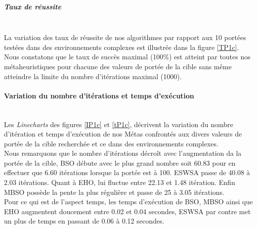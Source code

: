 \noindent
\begin{minipage}[t]{0.5\textwidth}
	\subparagraph{Taux de réussite}
	\textbf{}\\
	
	La variation des taux de réussite de nos algorithmes par rapport aux 10 portées testées dans des environnements complexes est illustrée dans la figure \ref{TP1c}.\\
	
	Nous constatons que le taux de succès maximal (100\%) est atteint par toutes nos métaheuristiques pour chacune des valeurs de portée de la cible sans même atteindre la limite du nombre d'itérations maximal (1000).

\end{minipage}\hfill
\begin{minipage}[t]{0.55\textwidth}
	\captionsetup{width=0.8\linewidth}
	\centering{}
	\vspace{-0.2cm}
	\label{TP1c}
\end{minipage}\hfill







\noindent
	\paragraph{Variation du nombre d'itérations et temps d'exécution}
	\textbf{ }\\
	
	Les \textit{Linecharts} des figures \ref{IP1c} et \ref{tP1c}, décrivent la variation du nombre d'itération et temps d'exécution de nos Métas confrontés aux divers valeurs de portée de la cible recherchée et ce dans des environnements complexes.\\
	
	Nous remarquons que le nombre d'itérations décroît avec l'augmentation da la portée de la cible, BSO débute avec le plus grand nombre soit 60.83 pour en effectuer que 6.60 itérations lorsque la portée est à 100. ESWSA passe de 40.08 à 2.03 itérations. Quant à EHO, lui fluctue entre 22.13 et 1.48 itération. Enfin MBSO possède la pente la plus régulière et passe de 25 à 3.05 itérations.\\
	
	Pour ce qui est de l'aspect temps, les temps d'exécution de BSO, MBSO ainsi que EHO augmentent doucement entre 0.02 et 0.04 secondes, ESWSA par contre met un plus de temps en passant de 0.06 à 0.12 secondes.



